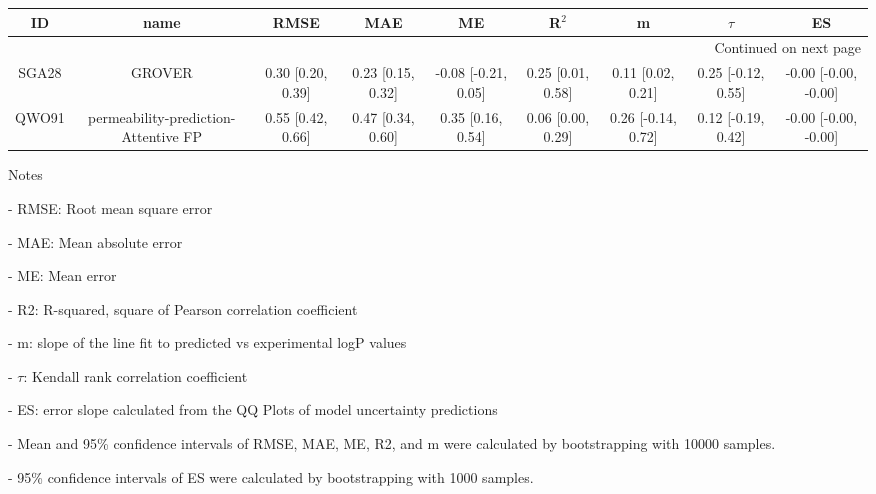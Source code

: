 \documentclass{article}
\begin{document}
\begin{center}
\scriptsize
\begin{longtable}{|ccccccccc|}
\toprule
    ID &                                  name &               RMSE &                MAE &                   ME &              R$^2$ &                   m &              $\tau$ &                    ES \\
\midrule
\endhead
\midrule
\multicolumn{9}{r}{{Continued on next page}} \\
\midrule
\endfoot

\bottomrule
\endlastfoot
 SGA28 &                                GROVER &  0.30 [0.20, 0.39] &  0.23 [0.15, 0.32] &  -0.08 [-0.21, 0.05] &  0.25 [0.01, 0.58] &   0.11 [0.02, 0.21] &  0.25 [-0.12, 0.55] &  -0.00 [-0.00, -0.00] \\
 QWO91 &  permeability-prediction-Attentive FP &  0.55 [0.42, 0.66] &  0.47 [0.34, 0.60] &    0.35 [0.16, 0.54] &  0.06 [0.00, 0.29] &  0.26 [-0.14, 0.72] &  0.12 [-0.19, 0.42] &  -0.00 [-0.00, -0.00] \\
\end{longtable}
\end{center}

Notes

- RMSE: Root mean square error

- MAE: Mean absolute error

- ME: Mean error

- R2: R-squared, square of Pearson correlation coefficient

- m: slope of the line fit to predicted vs experimental logP values

- $\tau$:  Kendall rank correlation coefficient

- ES: error slope calculated from the QQ Plots of model uncertainty predictions

- Mean and 95\% confidence intervals of RMSE, MAE, ME, R2, and m were calculated by bootstrapping with 10000 samples.

- 95\% confidence intervals of ES were calculated by bootstrapping with 1000 samples.\end{document}
\end{document}

